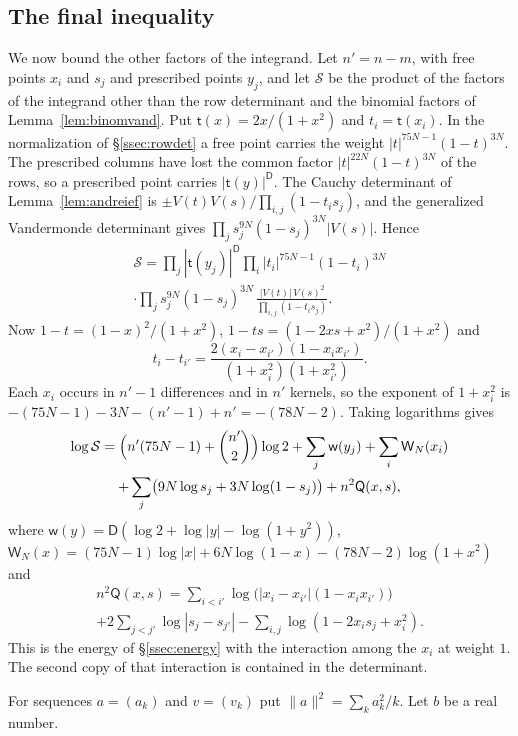 \subsection{The final inequality}\label{ssec:budget}
We now bound the other factors of the integrand. Let $n'=n-m$, with free points $x_i$ and $s_j$ and prescribed points $y_j$, and let $\mathcal S$ be the product of the
factors of the integrand other than the row determinant and the binomial factors of Lemma~\ref{lem:binomvand}. Put $\mathsf t(x)=2x/(1+x^2)$ and $t_i=\mathsf t(x_i)$. In the normalization of
\S\ref{ssec:rowdet} a free point carries the weight $|t|^{75N-1}(1-t)^{3N}$. The prescribed columns have lost the common factor $|t|^{22N}(1-t)^{3N}$ of the rows, so a prescribed point
carries $|\mathsf t(y)|^{\mathsf D}$. The Cauchy determinant of Lemma~\ref{lem:andreief} is $\pm V(t)V(s)/\prod_{i,j}(1-t_is_j)$, and the generalized Vandermonde determinant gives
$\prod_js_j^{9N}(1-s_j)^{3N}|V(s)|$. Hence
\begin{multline*}
 \mathcal S=\prod_j|\mathsf t(y_j)|^{\mathsf D}\prod_i|t_i|^{75N-1}(1-t_i)^{3N}\\
 \cdot\prod_js_j^{9N}(1-s_j)^{3N}\,\frac{|V(t)|\,V(s)^2}{\prod_{i,j}(1-t_is_j)}.
\end{multline*}
Now $1-t=(1-x)^2/(1+x^2)$, $1-ts=(1-2xs+x^2)/(1+x^2)$ and
\[
 t_i-t_{i'}=\frac{2(x_i-x_{i'})(1-x_ix_{i'})}{(1+x_i^2)(1+x_{i'}^2)}.
\]
Each $x_i$ occurs in $n'-1$ differences and in $n'$ kernels, so the exponent of $1+x_i^2$ is $-(75N-1)-3N-(n'-1)+n'=-(78N-2)$. Taking logarithms gives
\begin{multline}\label{eq:scalar}
 \log\mathcal S=\Bigl(n'(75N-1)+\binom{n'}2\Bigr)\log2+\sum_j\mathsf w(y_j)+\sum_i\mathsf W_N(x_i)\\
 +\sum_j\bigl(9N\log s_j+3N\log(1-s_j)\bigr)+n^2\mathsf Q(x,s),
\end{multline}
where $\mathsf w(y)=\mathsf D(\log2+\log|y|-\log(1+y^2))$, $\mathsf W_N(x)=(75N-1)\log|x|+6N\log(1-x)-(78N-2)\log(1+x^2)$ and
\begin{multline*}
 n^2\mathsf Q(x,s)=\sum_{i<i'}\log\bigl(|x_i-x_{i'}|(1-x_ix_{i'})\bigr)\\
 +2\sum_{j<j'}\log|s_j-s_{j'}|-\sum_{i,j}\log(1-2x_is_j+x_i^2).
\end{multline*}
This is the energy of \S\ref{ssec:energy} with the interaction among the $x_i$ at weight $1$. The second copy of that interaction is
contained in the determinant.

For sequences $a=(a_k)$ and $v=(v_k)$ put $\|a\|^2=\sum_ka_k^2/k$. Let $b$ be a real number.

